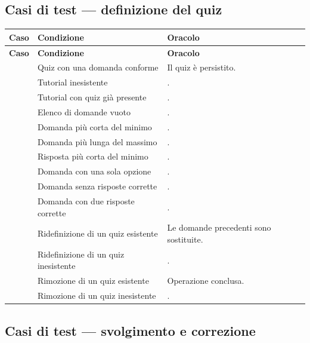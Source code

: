 \subsection{Casi di test — definizione del quiz}

\begin{longtable}{@{}l L{5.0cm} L{7.4cm}@{}}
\toprule
\textbf{Caso} & \textbf{Condizione} & \textbf{Oracolo} \\
\midrule
\endfirsthead
\toprule
\textbf{Caso} & \textbf{Condizione} & \textbf{Oracolo} \\
\midrule
\endhead
\bottomrule
\endlastfoot

 & Quiz con una domanda conforme & Il quiz è persistito. \\
 & Tutorial inesistente & . \\
 & Tutorial con quiz già presente & . \\
 & Elenco di domande vuoto & . \\
 & Domanda più corta del minimo & . \\
 & Domanda più lunga del massimo & . \\
 & Risposta più corta del minimo & . \\
 & Domanda con una sola opzione & . \\
 & Domanda senza risposte corrette & . \\
 & Domanda con due risposte corrette & . \\
 & Ridefinizione di un quiz esistente &
Le domande precedenti sono sostituite. \\
 & Ridefinizione di un quiz inesistente & . \\
 & Rimozione di un quiz esistente & Operazione conclusa. \\
 & Rimozione di un quiz inesistente & . \\

\end{longtable}

\subsection{Casi di test — svolgimento e correzione}


